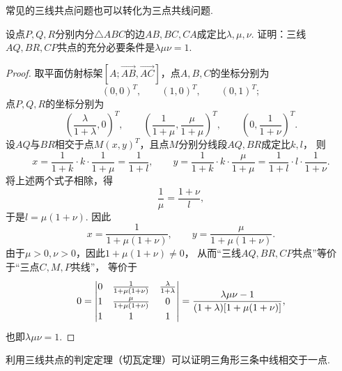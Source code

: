 常见的三线共点问题也可以转化为三点共线问题.

\begin{example}[切瓦定理]
设点\(P,Q,R\)分别内分\(\triangle ABC\)的边\(AB,BC,CA\)成定比\(\lambda,\mu,\nu\).
证明：三线\(AQ,BR,CP\)共点的充分必要条件是\(\lambda \mu \nu = 1\).
\begin{proof}
取平面仿射标架\([A;\vec{AB},\vec{AC}]\)，点\(A,B,C\)的坐标分别为\begin{equation*}
	(0,0)^T, \qquad
	(1,0)^T, \qquad
	(0,1)^T;
\end{equation*}
点\(P,Q,R\)的坐标分别为\begin{equation*}
	\left(\frac{\lambda}{1+\lambda},0\right)^T, \qquad
	\left(\frac{1}{1+\mu},\frac{\mu}{1+\mu}\right)^T, \qquad
	\left(0,\frac{1}{1+\nu}\right)^T.
\end{equation*}
设\(AQ\)与\(BR\)相交于点\(M(x,y)^T\)，且点\(M\)分别分线段\(AQ,BR\)成定比\(k,l\)，
则\begin{equation*}
x = \frac{1}{1+k} \cdot k \cdot \frac{1}{1+\mu}
= \frac{1}{1+l}, \qquad
y = \frac{1}{1+k} \cdot k \cdot \frac{\mu}{1+\mu}
= \frac{1}{1+l} \cdot l \cdot \frac{1}{1+\nu}.
\end{equation*}
将上述两个式子相除，得\begin{equation*}
\frac{1}{\mu}
= \frac{1+\nu}{l},
\end{equation*}于是\(l = \mu(1+\nu)\).
因此\begin{equation*}
	x = \frac{1}{1+\mu(1+\nu)}, \qquad
	y = \frac{\mu}{1+\mu(1+\nu)}.
\end{equation*}
由于\(\mu>0,\nu>0\)，因此\(1+\mu(1+\nu)\neq0\)，
从而“三线\(AQ,BR,CP\)共点”等价于“三点\(C,M,P\)共线”，
等价于\begin{equation*}
	0 = \def\arraystretch{1.2} \begin{vmatrix}
		0 & \frac{1}{1+\mu(1+\nu)} & \frac{\lambda}{1+\lambda} \\
		1 & \frac{\mu}{1+\mu(1+\nu)} & 0 \\
		1 & 1 & 1
	\end{vmatrix}
	= \frac{\lambda \mu \nu - 1}{(1+\lambda) [1+\mu(1+\nu)]},
\end{equation*}
也即\(\lambda \mu \nu = 1\).
\end{proof}
\end{example}

利用三线共点的判定定理（切瓦定理）可以证明三角形三条中线相交于一点.
